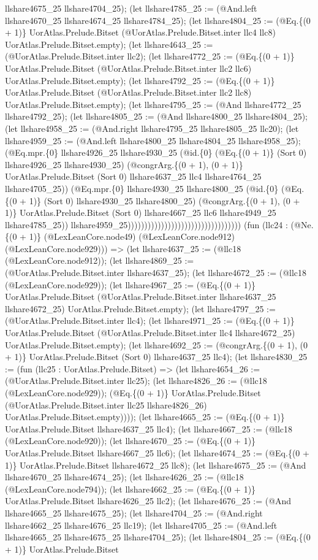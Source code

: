 \documentclass[11pt]{article}
\begin{document}
llshare4675\_25 llshare4704\_25); (let llshare4785\_25 := (@And.left llshare4670\_25 llshare4674\_25 llshare4784\_25); (let llshare4804\_25 := (@Eq.\{(0 + 1)\} UorAtlas.Prelude.Bitset (@UorAtlas.Prelude.Bitset.inter llc4 llc8) UorAtlas.Prelude.Bitset.empty); (let llshare4643\_25 := (@UorAtlas.Prelude.Bitset.inter llc2); (let llshare4772\_25 := (@Eq.\{(0 + 1)\} UorAtlas.Prelude.Bitset (@UorAtlas.Prelude.Bitset.inter llc2 llc6) UorAtlas.Prelude.Bitset.empty); (let llshare4792\_25 := (@Eq.\{(0 + 1)\} UorAtlas.Prelude.Bitset (@UorAtlas.Prelude.Bitset.inter llc2 llc8) UorAtlas.Prelude.Bitset.empty); (let llshare4795\_25 := (@And llshare4772\_25 llshare4792\_25); (let llshare4805\_25 := (@And llshare4800\_25 llshare4804\_25); (let llshare4958\_25 := (@And.right llshare4795\_25 llshare4805\_25 llc20); (let llshare4959\_25 := (@And.left llshare4800\_25 llshare4804\_25 llshare4958\_25); (@Eq.mpr.\{0\} llshare4926\_25 llshare4930\_25 (@id.\{0\} (@Eq.\{(0 + 1)\} (Sort 0) llshare4926\_25 llshare4930\_25) (@congrArg.\{(0 + 1), (0 + 1)\} UorAtlas.Prelude.Bitset (Sort 0) llshare4637\_25 llc4 llshare4764\_25 llshare4705\_25)) (@Eq.mpr.\{0\} llshare4930\_25 llshare4800\_25 (@id.\{0\} (@Eq.\{(0 + 1)\} (Sort 0) llshare4930\_25 llshare4800\_25) (@congrArg.\{(0 + 1), (0 + 1)\} UorAtlas.Prelude.Bitset (Sort 0) llshare4667\_25 llc6 llshare4949\_25 llshare4785\_25)) llshare4959\_25)))))))))))))))))))))))))))))))))) (fun (llc24 : (@Ne.\{(0 + 1)\} (@LexLeanCore.node49) (@LexLeanCore.node912) (@LexLeanCore.node929))) => (let llshare4637\_25 := (@llc18 (@LexLeanCore.node912)); (let llshare4869\_25 := (@UorAtlas.Prelude.Bitset.inter llshare4637\_25); (let llshare4672\_25 := (@llc18 (@LexLeanCore.node929)); (let llshare4967\_25 := (@Eq.\{(0 + 1)\} UorAtlas.Prelude.Bitset (@UorAtlas.Prelude.Bitset.inter llshare4637\_25 llshare4672\_25) UorAtlas.Prelude.Bitset.empty); (let llshare4797\_25 := (@UorAtlas.Prelude.Bitset.inter llc4); (let llshare4971\_25 := (@Eq.\{(0 + 1)\} UorAtlas.Prelude.Bitset (@UorAtlas.Prelude.Bitset.inter llc4 llshare4672\_25) UorAtlas.Prelude.Bitset.empty); (let llshare4692\_25 := (@congrArg.\{(0 + 1), (0 + 1)\} UorAtlas.Prelude.Bitset (Sort 0) llshare4637\_25 llc4); (let llshare4830\_25 := (fun (llc25 : UorAtlas.Prelude.Bitset) => (let llshare4654\_26 := (@UorAtlas.Prelude.Bitset.inter llc25); (let llshare4826\_26 := (@llc18 (@LexLeanCore.node929)); (@Eq.\{(0 + 1)\} UorAtlas.Prelude.Bitset (@UorAtlas.Prelude.Bitset.inter llc25 llshare4826\_26) UorAtlas.Prelude.Bitset.empty)))); (let llshare4665\_25 := (@Eq.\{(0 + 1)\} UorAtlas.Prelude.Bitset llshare4637\_25 llc4); (let llshare4667\_25 := (@llc18 (@LexLeanCore.node920)); (let llshare4670\_25 := (@Eq.\{(0 + 1)\} UorAtlas.Prelude.Bitset llshare4667\_25 llc6); (let llshare4674\_25 := (@Eq.\{(0 + 1)\} UorAtlas.Prelude.Bitset llshare4672\_25 llc8); (let llshare4675\_25 := (@And llshare4670\_25 llshare4674\_25); (let llshare4626\_25 := (@llc18 (@LexLeanCore.node794)); (let llshare4662\_25 := (@Eq.\{(0 + 1)\} UorAtlas.Prelude.Bitset llshare4626\_25 llc2); (let llshare4676\_25 := (@And llshare4665\_25 llshare4675\_25); (let llshare4704\_25 := (@And.right llshare4662\_25 llshare4676\_25 llc19); (let llshare4705\_25 := (@And.left llshare4665\_25 llshare4675\_25 llshare4704\_25); (let llshare4804\_25 := (@Eq.\{(0 + 1)\} UorAtlas.Prelude.Bitset 
\end{document}

